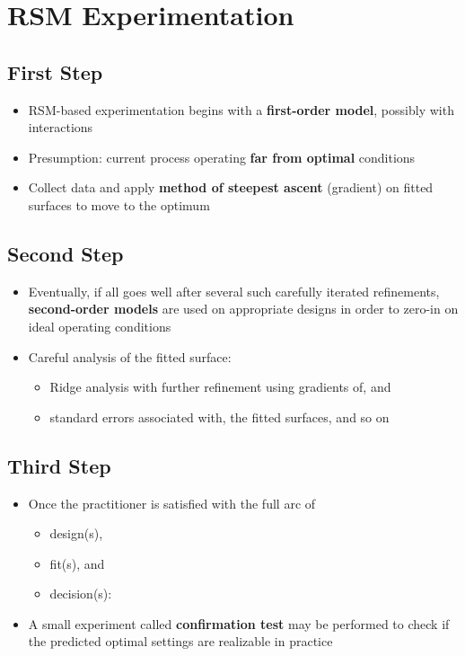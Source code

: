 \documentclass[
  letterpaper,
  DIV=11,
  numbers=noendperiod]{scrreprt}
\providecommand{\tightlist}{%
  \setlength{\itemsep}{0pt}\setlength{\parskip}{0pt}}\usepackage{longtable,booktabs,array}
\begin{document}
\section{RSM Experimentation}\label{rsm-experimentation}

\subsection{First Step}\label{first-step}

\begin{itemize}
\tightlist
\item
  RSM-based experimentation begins with a \textbf{first-order model},
  possibly with interactions
\item
  Presumption: current process operating \textbf{far from optimal}
  conditions
\item
  Collect data and apply \textbf{method of steepest ascent} (gradient)
  on fitted surfaces to move to the optimum
\end{itemize}

\subsection{Second Step}\label{second-step}

\begin{itemize}
\tightlist
\item
  Eventually, if all goes well after several such carefully iterated
  refinements, \textbf{second-order models} are used on appropriate
  designs in order to zero-in on ideal operating conditions
\item
  Careful analysis of the fitted surface:

  \begin{itemize}
  \tightlist
  \item
    Ridge analysis with further refinement using gradients of, and
  \item
    standard errors associated with, the fitted surfaces, and so on
  \end{itemize}
\end{itemize}

\subsection{Third Step}\label{third-step}

\begin{itemize}
\tightlist
\item
  Once the practitioner is satisfied with the full arc of

  \begin{itemize}
  \tightlist
  \item
    design(s),
  \item
    fit(s), and
  \item
    decision(s):
  \end{itemize}
\item
  A small experiment called \textbf{confirmation test} may be performed
  to check if the predicted optimal settings are realizable in practice
\end{itemize}
\end{document}
